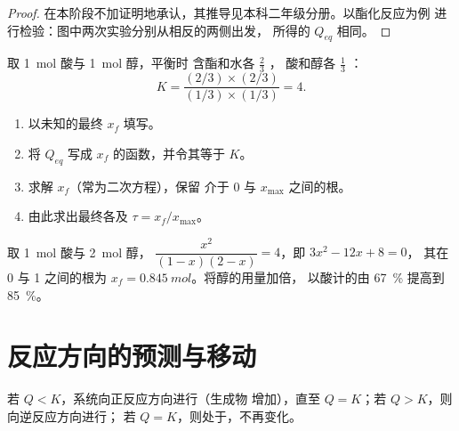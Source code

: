 \begin{proof}
在本阶段不加证明地承认，其推导见本科二年级分册。以酯化反应为例
进行检验：图中两次实验分别从相反的两侧出发，
所得的 $Q_{eq}$ 相同。
\end{proof}

\begin{example}[酯化反应的 $K$]\label{ex:g12:equilibrium:k-ester}
取 \qty{1}{mol} 酸与 \qty{1}{mol} 醇，平衡时
含酯和水各 $\frac{2}{3}$ ，
酸和醇各 $\frac{1}{3}$ ：
\[
  K = \frac{(2/3)\times(2/3)}{(1/3)\times(1/3)} = 4 .
\]
\end{example}

\begin{method}[非完全反应的最终状态]\label{met:g12:equilibrium:final}
\begin{enumerate}
  \item 以未知的最终 $x_f$ 填写。
  \item 将 $Q_{eq}$ 写成 $x_f$ 的函数，并令其等于 $K$。
  \item 求解 $x_f$（常为二次方程），保留
        介于 0 与 $x_{\max}$ 之间的根。
  \item 由此求出最终各及 $\tau = x_f/x_{\max}$。
\end{enumerate}
\end{method}

\begin{example}[醇过量]\label{ex:g12:equilibrium:excess}
取 \qty{1}{mol} 酸与 \qty{2}{mol} 醇，
$\dfrac{x^2}{(1-x)(2-x)} = 4$，即 $3x^2 - 12x + 8 = 0$，
其在 0 与 1 之间的根为 $x_f = \qty{0.845}{mol}$。将醇的用量加倍，
以酸计的由 \qty{67}{\percent} 提高到
\qty{85}{\percent}。
\end{example}

\section{反应方向的预测与移动}

\begin{proposition}[反应的移动方向]\label{prop:g12:equilibrium:direction}
若 $Q < K$，系统向正反应方向进行（生成物
增加），直至 $Q = K$；若 $Q > K$，则向逆反应方向进行；
若 $Q = K$，则处于，不再变化。
\end{proposition}

